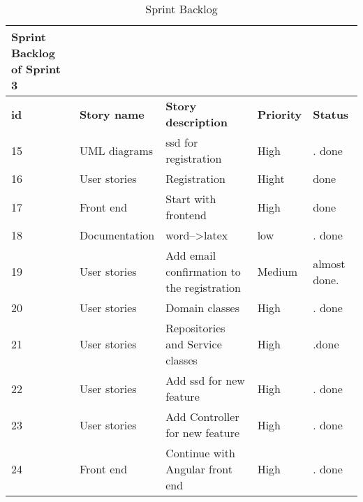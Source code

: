 \documentclass{scrartcl}
\begin{document}
\begin{table}[H]

\begin{center}
\begin{tabular}{| p{2.5cm}| p{4cm} | p{5cm} |p{2.5cm} | p{4cm}|}
   Sprint Backlog of Sprint 3\\ \hline
    

          \textbf{id}  &  \textbf{Story name} &  \textbf{Story description} &  \textbf{Priority}  & \textbf{Status}\\ \hline            
                    
                 
                    15 & UML diagrams & ssd for registration  & High & .  done\\ \hline
                      16 & User stories & Registration & Hight &  done \\ \hline
                       17 & Front end & Start with frontend & High &   done \\ \hline
                        18 & Documentation & word-->latex & low & . done\\ \hline
                         19 & User stories & Add email confirmation to the registration & Medium & almost done. \\ \hline
                          20 & User stories & Domain classes & High & . done\\ \hline
                           21 & User stories & Repositories and Service classes & High & .done \\ \hline
                            22 & User stories & Add ssd for new feature  & High & . done\\ \hline
                            23 & User stories &  Add Controller for new feature & High & . done\\ \hline
          24 & Front end  & Continue with Angular front end  & High & . done\\ \hline
          
            \end{tabular}
    \end{center}
    \caption{Sprint Backlog}
    \label{tab:typo}
\end{table}
          
\end{document}
